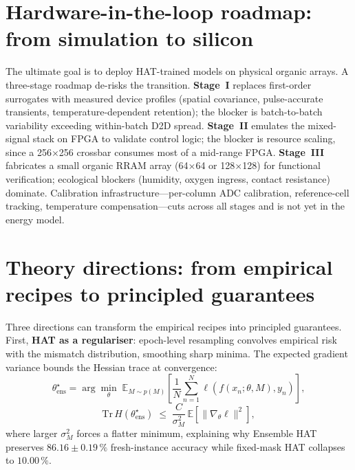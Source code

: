 \section{Hardware-in-the-loop roadmap: from simulation to silicon}
\label{sec:hardware-roadmap}

The ultimate goal is to deploy HAT-trained models on physical organic arrays.  A three-stage roadmap de-risks the transition.  \textbf{Stage~I} replaces first-order surrogates with measured device profiles (spatial covariance, pulse-accurate transients, temperature-dependent retention); the blocker is batch-to-batch variability exceeding within-batch D2D spread.  \textbf{Stage~II} emulates the mixed-signal stack on FPGA to validate control logic; the blocker is resource scaling, since a 256$\times$256 crossbar consumes most of a mid-range FPGA.  \textbf{Stage~III} fabricates a small organic RRAM array (64$\times$64 or 128$\times$128) for functional verification; ecological blockers (humidity, oxygen ingress, contact resistance) dominate.  Calibration infrastructure---per-column ADC calibration, reference-cell tracking, temperature compensation---cuts across all stages and is not yet in the energy model.


\section{Theory directions: from empirical recipes to principled guarantees}
\label{sec:theory-directions}

Three directions can transform the empirical recipes into principled guarantees.  First, \textbf{HAT as a regulariser}: epoch-level resampling convolves empirical risk with the mismatch distribution, smoothing sharp minima.  The expected gradient variance bounds the Hessian trace at convergence:
\begin{equation}
    \theta_{\mathrm{ens}}^{\star}
    = \arg\min_{\theta}\;
    \mathbb{E}_{M\sim p(M)}\!\left[
        \frac{1}{N}\sum_{n=1}^{N}
        \ell\!\left(f(x_{n};\theta,M),y_{n}\right)
    \right],
    \label{eq:ens-hat-repeat}
\end{equation}
\begin{equation}
    \mathrm{Tr}\,H(\theta_{\mathrm{ens}}^{\star})
    \;\le\;
    \frac{C}{\sigma_{M}^{2}}\,
    \mathbb{E}\!\left[\|\nabla_{\theta}\ell\|^{2}\right],
    \label{eq:hessian-bound}
\end{equation}
where larger $\sigma_{M}^{2}$ forces a flatter minimum, explaining why Ensemble HAT preserves $86.16\pm0.19\,\%$ fresh-instance accuracy while fixed-mask HAT collapses to $10.00\,\%$.

